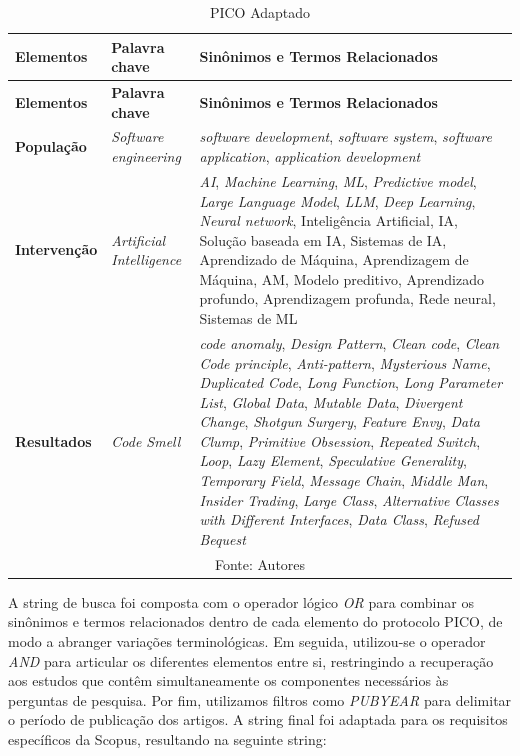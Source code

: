 \begin{longtable}{|p{3.2cm}|p{3cm}|p{6cm}|}
\caption{PICO Adaptado}
\label{tab:picoadaptado} \\
\hline
\textbf{Elementos} & \textbf{Palavra chave} & \textbf{Sinônimos e Termos Relacionados} \\
\hline
\endfirsthead

\hline
\textbf{Elementos} & \textbf{Palavra chave} & \textbf{Sinônimos e Termos Relacionados} \\
\hline
\endhead

\textbf{População} & \textit{Software engineering} & \textit{software development}, \textit{software system}, \textit{software application}, \textit{application development} \\
\hline

\textbf{Intervenção} & \textit{Artificial Intelligence} & \textit{AI}, \textit{Machine Learning}, \textit{ML}, \textit{Predictive model}, \textit{Large Language Model}, \textit{LLM}, \textit{Deep Learning}, \textit{Neural network}, Inteligência Artificial, IA, Solução baseada em IA, Sistemas de IA, Aprendizado de Máquina, Aprendizagem de Máquina, AM, Modelo preditivo, Aprendizado profundo, Aprendizagem profunda, Rede neural, Sistemas de ML \\
\hline

\textbf{Resultados} & \textit{Code Smell} & \textit{code anomaly}, \textit{Design Pattern}, \textit{Clean code}, \textit{Clean Code principle}, \textit{Anti-pattern}, \textit{Mysterious Name}, \textit{Duplicated Code}, \textit{Long Function}, \textit{Long Parameter List}, \textit{Global Data}, \textit{Mutable Data}, \textit{Divergent Change}, \textit{Shotgun Surgery}, \textit{Feature Envy}, \textit{Data Clump}, \textit{Primitive Obsession}, \textit{Repeated Switch}, \textit{Loop}, \textit{Lazy Element}, \textit{Speculative Generality}, \textit{Temporary Field}, \textit{Message Chain}, \textit{Middle Man}, \textit{Insider Trading}, \textit{Large Class}, \textit{Alternative Classes with Different Interfaces}, \textit{Data Class}, \textit{Refused Bequest} \\
\hline

\multicolumn{3}{c}{Fonte: Autores}
\end{longtable}
A string de busca foi composta com o operador lógico \textit{OR} para combinar os sinônimos e termos relacionados 
dentro de cada elemento do protocolo PICO, de modo a abranger variações terminológicas. Em seguida, utilizou-se o 
operador \textit{AND} para articular os diferentes elementos entre si, restringindo a recuperação aos estudos que 
contêm simultaneamente os componentes necessários às perguntas de pesquisa. Por fim, utilizamos filtros como \textit{PUBYEAR} 
para delimitar o período de publicação dos artigos. A string final foi adaptada para os requisitos 
específicos da Scopus, resultando na seguinte string:

